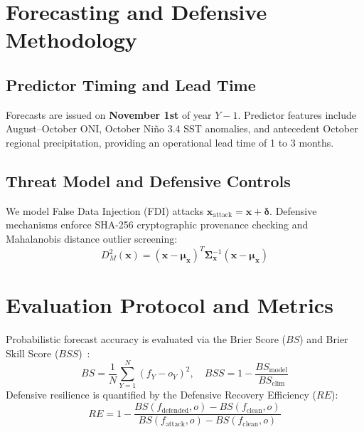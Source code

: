 \documentclass[runningheads]{llncs}
\begin{document}
\section{Forecasting and Defensive Methodology}
\subsection{Predictor Timing and Lead Time}
Forecasts are issued on \textbf{November 1st} of year $Y-1$. Predictor features include August--October ONI, October Niño 3.4 SST anomalies, and antecedent October regional precipitation, providing an operational lead time of 1 to 3 months.

\subsection{Threat Model and Defensive Controls}
We model False Data Injection (FDI) attacks $\mathbf{x}_{\text{attack}} = \mathbf{x} + \boldsymbol{\delta}$. Defensive mechanisms enforce SHA-256 cryptographic provenance checking and Mahalanobis distance outlier screening:
\begin{equation}
    D_M^2(\mathbf{x}) = (\mathbf{x} - \boldsymbol{\mu}_{\mathbf{x}})^T \boldsymbol{\Sigma}_{\mathbf{x}}^{-1} (\mathbf{x} - \boldsymbol{\mu}_{\mathbf{x}})
\end{equation}

\section{Evaluation Protocol and Metrics}
Probabilistic forecast accuracy is evaluated via the Brier Score ($BS$) and Brier Skill Score ($BSS$)~\cite{brier1950verification,murphy1973new}:
\begin{equation}
    BS = \frac{1}{N} \sum_{Y=1}^N (f_Y - o_Y)^2, \quad BSS = 1 - \frac{BS_{\text{model}}}{BS_{\text{clim}}}
\end{equation}
Defensive resilience is quantified by the Defensive Recovery Efficiency ($RE$):
\begin{equation}
    RE = 1 - \frac{BS(f_{\text{defended}}, o) - BS(f_{\text{clean}}, o)}{BS(f_{\text{attack}}, o) - BS(f_{\text{clean}}, o)}
\end{equation}
\end{document}
